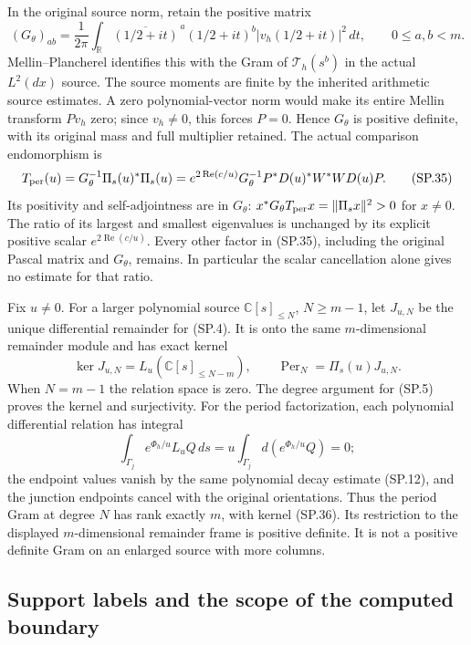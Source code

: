 In the original source norm, retain the positive matrix
\[
 (G_\theta)_{ab}
 =\frac1{2\pi}\int_{\mathbb R}
   \overline{(1/2+it)}^{\,a}(1/2+it)^b
   |v_h(1/2+it)|^2\,dt,\qquad 0\le a,b<m .
 \tag{SP.34}\label{eq:sp-sourcegram}
\]
Mellin--Plancherel identifies this with the Gram of
\(\mathcal T_h(s^b)\) in the actual \(L^2(dx)\) source.
The source moments are finite by the inherited arithmetic
source estimates. A zero polynomial-vector norm would
make its entire Mellin transform \(Pv_h\) zero; since
\(v_h\ne0\), this forces \(P=0\).
Hence \(G_\theta\) is positive definite, with its original
mass and full multiplier retained.
The actual comparison endomorphism is
\[
 T_{\rm per}(u)=G_\theta^{-1}\Pi_s(u)^*\Pi_s(u)
 =e^{2\operatorname{Re}(c/u)}
     G_\theta^{-1}P^*D(u)^*W^*WD(u)P .
 \tag{SP.35}\label{eq:sp-metriccomparison}
\]
Its positivity and self-adjointness are in \(G_\theta\):
\(x^*G_\theta T_{\rm per}x=\|\Pi_sx\|^2>0\) for \(x\ne0\).
The ratio of its largest and smallest eigenvalues is unchanged
by its explicit positive scalar \(e^{2\operatorname{Re}(c/u)}\).
Every other factor in (SP.35), including the original
Pascal matrix and \(G_\theta\), remains. In particular the
scalar cancellation alone gives no estimate for that ratio.

Fix \(u\ne0\). For a larger polynomial source \(\mathbb C[s]_{\le N}\),
\(N\ge m-1\), let \(J_{u,N}\) be the unique differential
remainder for (SP.4). It is onto the same \(m\)-dimensional
remainder module and has exact kernel
\[
 \ker J_{u,N}
   =L_u(\mathbb C[s]_{\le N-m}),\qquad
 \operatorname{Per}_N=\Pi_s(u)J_{u,N}.
 \tag{SP.36}\label{eq:sp-higherkernel}
\]
When \(N=m-1\) the relation space is zero.
The degree argument for (SP.5) proves the kernel and
surjectivity. For the period factorization, each polynomial
differential relation has integral
\[
 \int_{\Gamma_j}e^{\Phi_h/u}L_uQ\,ds
 =u\int_{\Gamma_j}d(e^{\Phi_h/u}Q)=0;
 \]
the endpoint values vanish by the same polynomial decay
estimate (SP.12), and the junction endpoints cancel with
the original orientations.
Thus the period Gram at degree \(N\) has rank exactly \(m\),
with kernel (SP.36). Its restriction to the displayed
\(m\)-dimensional remainder frame is positive definite.
It is not a positive definite Gram on an enlarged source
with more columns.

\subsection{Support labels and the scope of the computed boundary}

